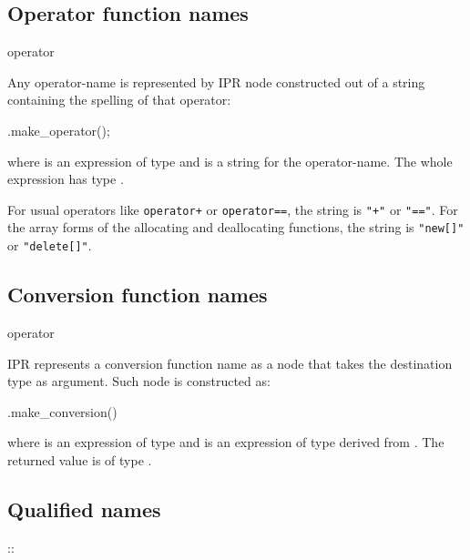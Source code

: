 \documentclass[a4paper,12pt]{article}
\begin{document}
\subsection{Operator function names}
\label{sec:name.operator}
\begin{Grammar}
     operator 
\end{Grammar}
Any operator-name is represented by IPR node constructed out of a string
containing the spelling of that operator:
\begin{Program}
  .make_operator();
\end{Program}
where  is an expression of type  and 
is a string for the operator-name.  The whole expression has type
.

For usual operators like \texttt{operator+} or \texttt{operator==}, the string
is \texttt{"+"} or \texttt{"=="}.  For the array forms of the allocating and
deallocating functions, the string is \texttt{"new[]"} or \texttt{"delete[]"}.


\subsection{Conversion function names}
\label{sec:name.conversion}
\begin{Grammar}
     operator 
\end{Grammar}

IPR represents a conversion function name as a node that takes the destination
type as argument.  Such node is constructed as:
\begin{Program}
  .make_conversion()
\end{Program}
where  is an expression of type  and 
is an expression of type derived from .  The returned value is
of type .


\subsection{Qualified names}
\label{sec:name.qualified}
\begin{Grammar}
     \cxxOpt{::}  
     {::} 
\end{Grammar}
\end{document}
